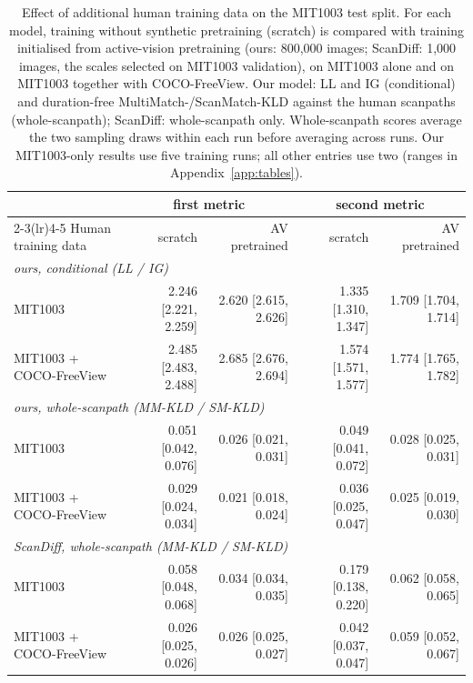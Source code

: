 \begin{table}[t]
  \centering
  \small
  \begin{tabular}{lrrrr}
    \toprule
    & \multicolumn{2}{c}{first metric} & \multicolumn{2}{c}{second metric} \\
    \cmidrule(lr){2-3}\cmidrule(lr){4-5}
    Human training data & scratch & AV pretrained & scratch & AV pretrained \\
    \midrule
    \multicolumn{5}{l}{\emph{ours, conditional (LL / IG)}} \\
    MIT1003 & 2.246 \scriptsize[2.221, 2.259] & 2.620 \scriptsize[2.615, 2.626] & 1.335 \scriptsize[1.310, 1.347] & 1.709 \scriptsize[1.704, 1.714] \\
    MIT1003 + COCO-FreeView & 2.485 \scriptsize[2.483, 2.488] & 2.685 \scriptsize[2.676, 2.694] & 1.574 \scriptsize[1.571, 1.577] & 1.774 \scriptsize[1.765, 1.782] \\
    \midrule
    \multicolumn{5}{l}{\emph{ours, whole-scanpath (MM-KLD / SM-KLD)}} \\
    MIT1003 & 0.051 \scriptsize[0.042, 0.076] & 0.026 \scriptsize[0.021, 0.031] & 0.049 \scriptsize[0.041, 0.072] & 0.028 \scriptsize[0.025, 0.031] \\
    MIT1003 + COCO-FreeView & 0.029 \scriptsize[0.024, 0.034] & 0.021 \scriptsize[0.018, 0.024] & 0.036 \scriptsize[0.025, 0.047] & 0.025 \scriptsize[0.019, 0.030] \\
    \midrule
    \multicolumn{5}{l}{\emph{ScanDiff, whole-scanpath (MM-KLD / SM-KLD)}} \\
    MIT1003 & 0.058 \scriptsize[0.048, 0.068] & 0.034 \scriptsize[0.034, 0.035] & 0.179 \scriptsize[0.138, 0.220] & 0.062 \scriptsize[0.058, 0.065] \\
    MIT1003 + COCO-FreeView & 0.026 \scriptsize[0.025, 0.026] & 0.026 \scriptsize[0.025, 0.027] & 0.042 \scriptsize[0.037, 0.047] & 0.059 \scriptsize[0.052, 0.067] \\
    \bottomrule
  \end{tabular}
  \caption{Effect of additional human training data on the MIT1003 test split. For each model, training without synthetic pretraining (scratch) is compared with training initialised from active-vision pretraining (ours: 800,000 images; ScanDiff: 1,000 images, the scales selected on MIT1003 validation), on MIT1003 alone and on MIT1003 together with COCO-FreeView. Our model: LL and IG (conditional) and duration-free MultiMatch-/ScanMatch-KLD against the human scanpaths (whole-scanpath); ScanDiff: whole-scanpath only. Whole-scanpath scores average the two sampling draws within each run before averaging across runs. Our MIT1003-only results use five training runs; all other entries use two (ranges in Appendix~\ref{app:tables}).}
  \label{tab:additional-data}
\end{table}

